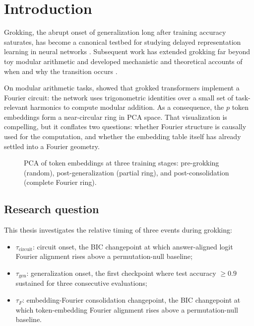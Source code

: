 \documentclass[12pt,openany,a4paper]{book}
\newcommand{\taug}{\tau_{\mathrm{gen}}}
\newcommand{\tauf}{\tau_{F}}
\newcommand{\taucirc}{\tau_{\mathrm{circuit}}}
\begin{document}
\mainmatter

\chapter{Introduction}
\label{ch:intro}

Grokking, the abrupt onset of generalization long after training accuracy saturates, has become a canonical testbed for studying delayed representation learning in neural networks \citep{power2022grokking}. Subsequent work has extended grokking far beyond toy modular arithmetic \citep{liu2023omnigrok,miller2024grokking} and developed mechanistic and theoretical accounts of when and why the transition occurs \citep{nanda2023progress,varma2023explaining,lyu2024dichotomy,rubin2024grokking}.

On modular arithmetic tasks, \citet{nanda2023progress} showed that grokked transformers implement a Fourier circuit: the network uses trigonometric identities over a small set of task-relevant harmonics to compute modular addition. As a consequence, the $p$ token embeddings form a near-circular ring in PCA space. That visualization is compelling, but it conflates two questions: whether Fourier structure is causally used for the computation, and whether the embedding table itself has already settled into a Fourier geometry.

\begin{figure}[htbp]
  \centering
  \caption{PCA of token embeddings at three training stages: pre-grokking (random), post-generalization (partial ring), and post-consolidation (complete Fourier ring).}
  \label{fig:pca_ring}
\end{figure}

\section{Research question}

This thesis investigates the relative timing of three events during grokking:
\begin{itemize}
  \item $\taucirc$: circuit onset, the BIC changepoint at which answer-aligned logit Fourier alignment rises above a permutation-null baseline;
  \item $\taug$: generalization onset, the first checkpoint where test accuracy $\geq 0.9$ sustained for three consecutive evaluations;
  \item $\tauf$: embedding-Fourier consolidation changepoint, the BIC changepoint at which token-embedding Fourier alignment rises above a permutation-null baseline.
\end{itemize}
\end{document}
